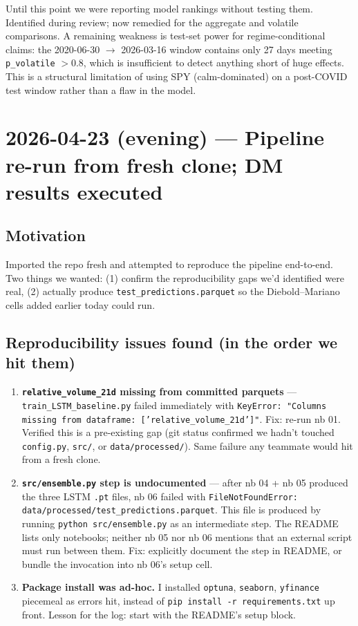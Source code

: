 \documentclass[11pt]{article}
\begin{document}
Until this point we were reporting model rankings without testing them. Identified during review; now remedied for the aggregate and volatile comparisons. A remaining weakness is test-set power for regime-conditional claims: the 2020-06-30 $\to$ 2026-03-16 window contains only 27 days meeting \texttt{p\_volatile} $> 0.8$, which is insufficient to detect anything short of huge effects. This is a structural limitation of using SPY (calm-dominated) on a post-COVID test window rather than a flaw in the model.

\hrulefill

\section*{2026-04-23 (evening) --- Pipeline re-run from fresh clone; DM results executed}

\subsection*{Motivation}

Imported the repo fresh and attempted to reproduce the pipeline end-to-end. Two things we wanted: (1) confirm the reproducibility gaps we'd identified were real, (2) actually produce \texttt{test\_predictions.parquet} so the Diebold--Mariano cells added earlier today could run.

\subsection*{Reproducibility issues found (in the order we hit them)}

\begin{enumerate}[leftmargin=*]
  \item \textbf{\texttt{relative\_volume\_21d} missing from committed parquets} --- \texttt{train\_LSTM\_baseline.py} failed immediately with \texttt{KeyError: "Columns missing from dataframe: ['relative\_volume\_21d']"}. Fix: re-run nb 01. Verified this is a pre-existing gap (git status confirmed we hadn't touched \texttt{config.py}, \texttt{src/}, or \texttt{data/processed/}). Same failure any teammate would hit from a fresh clone.

  \item \textbf{\texttt{src/ensemble.py} step is undocumented} --- after nb 04 + nb 05 produced the three LSTM \texttt{.pt} files, nb 06 failed with \texttt{FileNotFoundError: data/processed/test\_predictions.parquet}. This file is produced by running \texttt{python src/ensemble.py} as an intermediate step. The README lists only notebooks; neither nb 05 nor nb 06 mentions that an external script must run between them. Fix: explicitly document the step in README, or bundle the invocation into nb 06's setup cell.

  \item \textbf{Package install was ad-hoc.} I installed \texttt{optuna}, \texttt{seaborn}, \texttt{yfinance} piecemeal as errors hit, instead of \texttt{pip install -r requirements.txt} up front. Lesson for the log: start with the README's setup block.
\end{enumerate}
\end{document}
